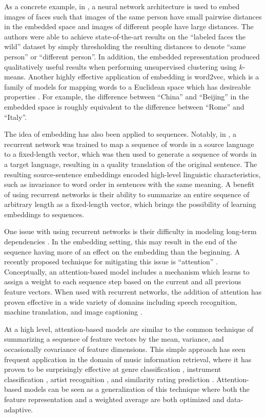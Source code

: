 \documentclass{article}
\begin{document}
As a concrete example, in \cite{schroff2015facenet}, a neural network architecture is used to embed images of faces such that images of the same person have small pairwise distances in the embedded space and images of different people have large distances.
The authors were able to achieve state-of-the-art results on the ``labeled faces the wild'' dataset by simply thresholding the resulting distances to denote ``same person'' or ``different person''.
In addition, the embedded representation produced qualitatively useful results when performing unsupervised clustering using $k$-means.
Another highly effective application of embedding is word2vec, which is a family of models for mapping words to a Euclidean space which has desireable properties \cite{mikolov2013distributed}.
For example, the difference between ``China'' and ``Beijing'' in the embedded space is roughly equivalent to the difference between ``Rome'' and ``Italy''.

The idea of embedding has also been applied to sequences.
Notably, in \cite{sutskever2014sequence}, a recurrent network was trained to map a sequence of words in a source language to a fixed-length vector, which was then used to generate a sequence of words in a target language, resulting in a quality translation of the original sentence.
The resulting source-sentence embeddings encoded high-level linguistic characteristics, such as invariance to word order in sentences with the same meaning.
A benefit of using recurrent networks is their ability to summarize an entire sequence of arbitrary length as a fixed-length vector, which brings the possibility of learning embeddings to sequences.

One issue with using recurrent networks is their difficulty in modeling long-term dependencies \cite{bengio1994learning}.
In the embedding setting, this may result in the end of the sequence having more of an effect on the embedding than the beginning.
A recently proposed technique for mitigating this issue is ``attention'' \cite{bahdanau2014neural}.
Conceptually, an attention-based model includes a mechanism which learns to assign a weight to each sequence step based on the current and all previous feature vectors.
When used with recurrent networks, the addition of attention has proven effective in a wide variety of domains including speech recognition, machine translation, and image captioning \cite{cho2015describing}.

At a high level, attention-based models are similar to the common technique of summarizing a sequence of feature vectors by the mean, variance, and occasionally covariance of feature dimensions.
This simple approach has seen frequent application in the domain of music information retrieval, where it has proven to be surprisingly effective at genre classification \cite{tzanetakis2002musical}, instrument classification \cite{deng2008study}, artist recognition \cite{mandel2005song}, and similarity rating prediction \cite{foster2014sequential}.
Attention-based models can be seen as a generalization of this technique where both the feature representation and a weighted average are both optimized and data-adaptive.
\end{document}
